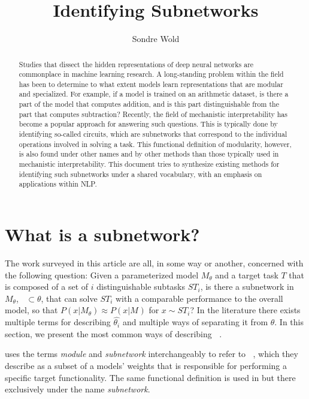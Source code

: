 \documentclass[11pt]{article}
\title{Identifying Subnetworks}
\author{Sondre Wold}
\DeclareMathOperator*{\subnetwork}{\hat{\theta_i}}
\begin{document}
\maketitle

\begin{abstract}
\noindent
Studies that dissect the hidden representations of deep neural networks are commonplace in machine learning research. A long-standing problem within the field has been to determine to what extent models learn representations that are modular and specialized. For example, if a model is trained on an arithmetic dataset, is there a part of the model that computes addition, and is this part  distinguishable from the part that computes subtraction? Recently, the field of mechanistic interpretability has become a popular approach for answering such questions. This is typically done by identifying so-called circuits, which are subnetworks that correspond to the individual operations involved in solving a task. This functional definition of modularity, however, is also found under other names and by other methods than those typically used in mechanistic interpretability. This document tries to synthesize existing methods for identifying such subnetworks under a shared vocabulary, with an emphasis on applications within NLP.
\end{abstract}

\section{What is a subnetwork?}
The work surveyed in this article are all, in some way or another, concerned with the following question: Given a parameterized model $M_\theta$ and a target task $T$ that is composed of a set of $i$ distinguishable subtasks $ST_i$, is there a subnetwork in $M_\theta$, $\subnetwork \subset \theta$, that can solve $ST_i$ with a comparable performance to the overall model, so that $P(x | M_\theta) \approx P(x | M_{\subnetwork})$ for $x \sim ST_i$? In the literature there exists  multiple terms for describing $\hat{\theta_i}$ and multiple ways of separating it from $\theta$. In this section, we present the most common ways of describing $\subnetwork$.

\citet{csordas2020neural} uses the terms \textit{module} and \textit{subnetwork} interchangeably to refer to $\subnetwork$, which they describe as a subset of a models' weights that is responsible for performing a specific target functionality. The same functional definition is used in \citet{lepori2023break} but there exclusively under the name \textit{subnetwork}. 
\end{document}
